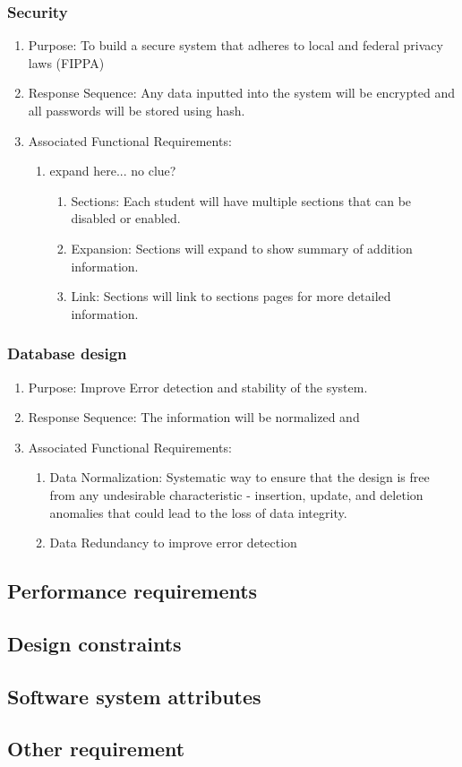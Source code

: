 \documentclass{journal}
\begin{document}
\subsubsection{Security}
\begin{enumerate}
\item Purpose: To build a secure system that adheres to local and federal privacy laws (FIPPA)
\item Response Sequence: Any data inputted into the system will be encrypted and all passwords will be stored using hash.
\item Associated Functional Requirements:
\begin{enumerate}
\item expand here... no clue?
\begin{enumerate}
\item Sections: Each student will have multiple sections that can be disabled or enabled.
\item Expansion: Sections will expand to show summary of addition information.
\item Link: Sections will link to sections pages for more detailed information.
\end{enumerate}
\end{enumerate}
\end{enumerate}

\subsubsection{Database design}
\begin{enumerate}
\item Purpose: Improve Error detection and stability of the system.
\item Response Sequence: The information will be normalized and 
\item Associated Functional Requirements:
\begin{enumerate}
\item Data Normalization: Systematic way to ensure that the design is free from any undesirable characteristic - insertion, update, and deletion anomalies that could lead to the loss of data integrity.
\item Data Redundancy to improve error detection
\end{enumerate}
\end{enumerate}


\subsection{Performance requirements}
\subsection{Design constraints}
\subsection{Software system attributes}
\subsection{Other requirement}

\newpage

\end{document}
